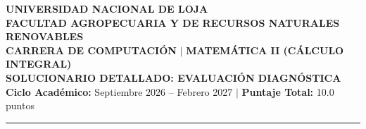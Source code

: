 \documentclass[11pt,a4paper]{article}
\begin{document}
\begin{center}
    {\fontsize{13}{15}\selectfont \textbf{\color{unlbluelight}UNIVERSIDAD NACIONAL DE LOJA}}\\[2pt]
    {\fontsize{10}{12}\selectfont \textbf{FACULTAD AGROPECUARIA Y DE RECURSOS NATURALES RENOVABLES}}\\[2pt]
    {\fontsize{10}{12}\selectfont \textbf{CARRERA DE COMPUTACIÓN} $\vert$ \textbf{MATEMÁTICA II (CÁLCULO INTEGRAL)}}\\[3pt]
    {\fontsize{12}{14}\selectfont \textbf{SOLUCIONARIO DETALLADO: EVALUACIÓN DIAGNÓSTICA}}\\[2pt]
    {\small \textbf{Ciclo Académico:} Septiembre 2026 -- Febrero 2027 \quad $\vert$ \quad \textbf{Puntaje Total:} 10.0 puntos}
\end{center}

\vspace{-4pt}
\noindent\rule{\textwidth}{1.2pt}

\vspace{6pt}
\end{document}
